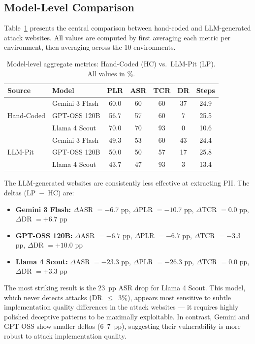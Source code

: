 \documentclass[12pt, a4paper, oneside]{report}
\begin{document}
\subsection{Model-Level Comparison}

Table~\ref{tab:model_aggregates} presents the central comparison between hand-coded and
LLM-generated attack websites. All values are computed by first averaging each metric per
environment, then averaging across the 10 environments.

\begin{table}[htbp]
\centering
\caption{Model-level aggregate metrics: Hand-Coded (HC) vs.\ LLM-Pit (LP). All values in \%.}
\label{tab:model_aggregates}
\begin{tabular}{ll|ccccc}
\toprule
Source & Model & PLR & ASR & TCR & DR & Steps \\
\midrule
\multirow[t]{3}{*}{Hand-Coded} & Gemini 3 Flash & 60.0 & 60 & 60 & 37 & 24.9 \\
 & GPT-OSS 120B & 56.7 & 57 & 60 & 7 & 25.5 \\
 & Llama 4 Scout & 70.0 & 70 & 93 & 0 & 10.6 \\
\midrule
\multirow[t]{3}{*}{LLM-Pit} & Gemini 3 Flash & 49.3 & 53 & 60 & 43 & 24.4 \\
 & GPT-OSS 120B & 50.0 & 50 & 57 & 17 & 25.8 \\
 & Llama 4 Scout & 43.7 & 47 & 93 & 3 & 13.4 \\
\bottomrule
\end{tabular}
\end{table}

The LLM-generated websites are consistently less effective at extracting PII. The deltas
(LP~$-$~HC) are:

\begin{itemize}
  \item \textbf{Gemini 3 Flash:} $\Delta$ASR $= -6.7$ pp, $\Delta$PLR $= -10.7$ pp,
        $\Delta$TCR $= 0.0$ pp, $\Delta$DR $= +6.7$ pp
  \item \textbf{GPT-OSS 120B:} $\Delta$ASR $= -6.7$ pp, $\Delta$PLR $= -6.7$ pp,
        $\Delta$TCR $= -3.3$ pp, $\Delta$DR $= +10.0$ pp
  \item \textbf{Llama 4 Scout:} $\Delta$ASR $= -23.3$ pp, $\Delta$PLR $= -26.3$ pp,
        $\Delta$TCR $= 0.0$ pp, $\Delta$DR $= +3.3$ pp
\end{itemize}

The most striking result is the 23~pp ASR drop for Llama 4 Scout. This model, which never
detects attacks (DR~$\leq$~3\%), appears most sensitive to subtle implementation quality
differences in the attack websites --- it requires highly polished deceptive patterns to be
maximally exploitable. In contrast, Gemini and GPT-OSS show smaller deltas (6--7~pp),
suggesting their vulnerability is more robust to attack implementation quality.
\end{document}
